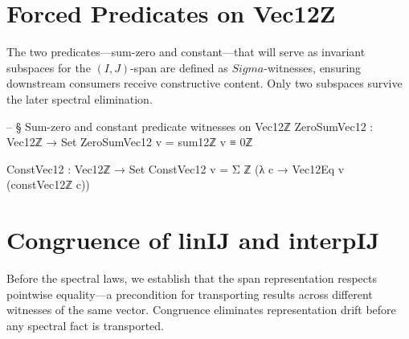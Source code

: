 \documentclass[11pt,a4paper]{book}
\def\Sigma{Sigma}%
\def\mathbb#1{#1}%
\def\texttt#1{#1}%
\def\text#1{#1}%
\def\texorpdfstring#1#2{#2}%
\begin{document}
\section{Forced Predicates on \texorpdfstring{$\text{Vec}_{12}\mathbb{Z}$}{Vec12Z}}

The two predicates---sum-zero and constant---that will serve
as invariant subspaces for the $(I,J)$-span are defined as
$\Sigma$-witnesses, ensuring downstream consumers receive
constructive content.  Only two subspaces survive
the later spectral elimination.

\begin{code}
-- § Sum-zero and constant predicate witnesses on Vec12ℤ
ZeroSumVec12 : Vec12ℤ → Set
ZeroSumVec12 v = sum12ℤ v ≡ 0ℤ

ConstVec12 : Vec12ℤ → Set
ConstVec12 v = Σ ℤ (λ c → Vec12Eq v (constVec12ℤ c))
\end{code}


\section{Congruence of \texorpdfstring{$\texttt{linIJ}$}{linIJ} and \texorpdfstring{$\texttt{interpIJ}$}{interpIJ}}

Before the spectral laws, we establish that the span representation
respects pointwise equality---a precondition for transporting
results across different witnesses of the same vector.  Congruence eliminates
representation drift before any spectral fact is transported.
\end{document}
